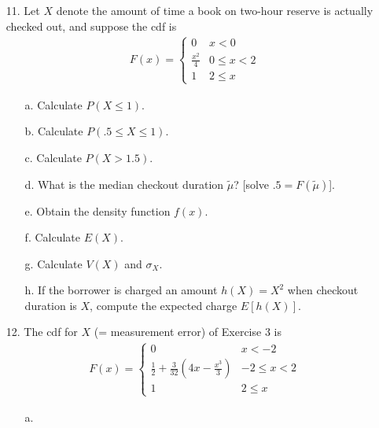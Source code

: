 \documentclass[letterpaper,12pt]{article}
\begin{document}
\maketitle

\begin{enumerate}
  \item[11.]
    Let $X$ denote the amount of time a book on two-hour reserve is actually checked out, and suppose the cdf is
    \begin{align*}
      F(x) = \begin{cases}
        0             & x < 0 \\
        \frac{x^2}{4} & 0 \le x < 2 \\
        1             & 2 \le x
      \end{cases}
    \end{align*}
    \begin{enumerate}
      \item[a.]
        Calculate $P(X \le 1)$.
      \item[b.]
        Calculate $P(.5 \le X \le 1)$.
      \item[c.]
        Calculate $P(X > 1.5)$.
      \item[d.]
        What is the median checkout duration $\tilde{\mu}$? [solve $.5 = F(\tilde{\mu})$].
      \item[e.]
        Obtain the density function $f(x)$.
      \item[f.]
        Calculate $E(X)$.
      \item[g.]
        Calculate $V(X)$ and $\sigma_X$.
      \item[h.]
        If the borrower is charged an amount $h(X) = X^2$ when checkout duration is $X$, compute the expected charge $E[h(X)]$.
    \end{enumerate}
  \item[12.]
    The cdf for $X$ (= measurement error) of Exercise 3 is
    \begin{align*}
      F(x) = \begin{cases}
        0                                                         & x < -2 \\
        \frac{1}{2} + \frac{3}{32}\left(4x - \frac{x^3}{3}\right) & -2 \le x < 2 \\
        1                                                         & 2 \le x
      \end{cases}
    \end{align*}
    \begin{enumerate}
      \item[a.]

\end{enumerate}
\end{enumerate}
\end{document}
